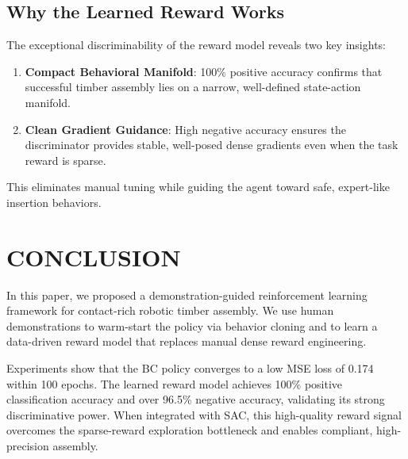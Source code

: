 \documentclass[conference]{IEEEtran}
\begin{document}
\subsection{Why the Learned Reward Works}
The exceptional discriminability of the reward model reveals two key insights:
\begin{enumerate}
    \item \textbf{Compact Behavioral Manifold}: 100\% positive accuracy confirms that successful timber assembly lies on a narrow, well-defined state-action manifold.
    \item \textbf{Clean Gradient Guidance}: High negative accuracy ensures the discriminator provides stable, well-posed dense gradients even when the task reward is sparse.
\end{enumerate}
This eliminates manual tuning while guiding the agent toward safe, expert-like insertion behaviors.\section{CONCLUSION}
In this paper, we proposed a demonstration-guided reinforcement learning framework for contact-rich robotic timber assembly. We use human demonstrations to warm-start the policy via behavior cloning and to learn a data-driven reward model that replaces manual dense reward engineering.

Experiments show that the BC policy converges to a low MSE loss of 0.174 within 100 epochs. The learned reward model achieves 100\% positive classification accuracy and over 96.5\% negative accuracy, validating its strong discriminative power. When integrated with SAC, this high-quality reward signal overcomes the sparse-reward exploration bottleneck and enables compliant, high-precision assembly.
\end{document}
